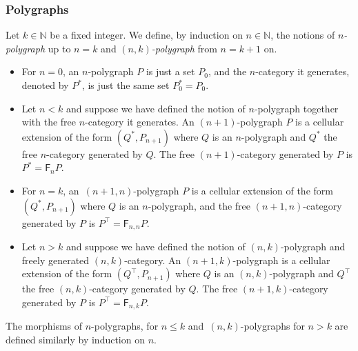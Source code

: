 \documentclass[reqno]{amsart}
\theoremstyle{plain}
\theoremstyle{definition}
\theoremstyle{remark}
\newcommand{\nmbr}[1]{\mathbb #1}
\newcommand{\N}{\nmbr{N}}
\newcommand{\pair}[2]{(#1,#2)}       %
\newcommand{\functor}[1]{\mathsf{#1}} %
\newcommand{\frf}[1]{\functor{F}_{#1}} %
\newcommand{\frcat}[1]{#1^*} %
\newcommand{\frgp}[1]{#1^\top} %
\newcommand{\clx}[2]{\pair{#1}{#2}}%
\begin{document}
\subsubsection{Polygraphs}\label{ssubsec:polyg}
Let $k\in\N$ be a fixed integer. We define, by induction on $n\in\N$,
the notions of {\em $n$-polygraph} up to $n=k$ and {\em
  $\pair{n}{k}$-polygraph} from $n=k{+}1$ on.
\begin{itemize}
\item For $n=0$, an
$n$-polygraph $P$ is just a set $P_0$, and the $n$-category it
generates, denoted by $\frcat P$, is just the same set $\frcat P_0=P_0$.
\item Let $n<k$ and suppose we have defined the notion of
  $n$-polygraph together with the free $n$-category it
  generates. An $(n{+}1)$-polygraph $P$ is a cellular extension of the
  form $\clx{\frcat Q\!}{P_{n+1}}$ where $Q$ is an $n$-polygraph and
  $\frcat Q$ the free $n$-category generated by $Q$. The free
  $(n{+}1)$-category generated by $P$ is $\frcat P=\frf
  nP$.
\item For $n=k$, an~$\pair{n{+}1}{n}$-polygraph $P$ is a cellular
  extension of the form $\clx{\frcat Q\!}{P_{n+1}}$ where $Q$ is an
  $n$-polygraph, and the free $\pair{n{+}1}n$-category generated by
  $P$ is $\frgp P=\frf{n,n}P$.
  \item Let $n>k$ and suppose we have defined the notion of $\pair
    nk$-polygraph and freely generated $\pair nk$-category. An
    $\pair{n{+}1}{k}$-polygraph is a cellular extension  of the form
    $\clx{\frgp Q\!}{P_{n+1}}$ where $Q$ is an $\pair nk$-polygraph and
    $\frgp Q$ the free $\pair nk$-category generated by $Q$. The free
    $\pair{n{+}1}k$-category generated by $P$ is $\frgp P=\frf{n,k}
    P$.
 \end{itemize}   
The morphisms of $n$-polygraphs, for $n\leq k$ and~$\pair
nk$-polygraphs for $n>k$ are defined similarly by
induction on $n$. 
\end{document}
